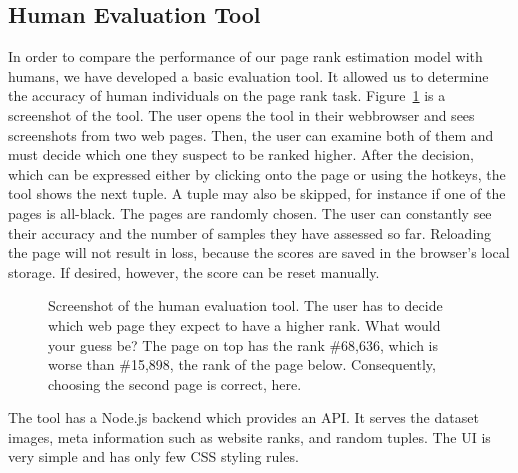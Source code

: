 \subsection{Human Evaluation Tool}
\label{sec:humanevaltool}

In order to compare the performance of our page rank estimation model with humans, we have developed a basic evaluation tool. It allowed us to determine the accuracy of human individuals on the page rank task. Figure~\ref{fig:humanevalscreenshot} is a screenshot of the tool. The user opens the tool in their webbrowser and sees screenshots from two web pages. Then, the user can examine both of them and must decide which one they suspect to be ranked higher. After the decision, which can be expressed either by clicking onto the page or using the hotkeys, the tool shows the next tuple. A tuple may also be skipped, for instance if one of the pages is all-black. The pages are randomly chosen. The user can constantly see their accuracy and the number of samples they have assessed so far. Reloading the page will not result in loss, because the scores are saved in the browser's local storage. If desired, however, the score can be reset manually.

\begin{figure}\centering
    \caption[Screenshot of the human evaluation tool]{Screenshot of the human evaluation tool. The user has to decide which web page they expect to have a higher rank. What would your guess be? The page on top has the rank \#68,636, which is worse than \#15,898, the rank of the page below. Consequently, choosing the second page is correct, here.}\label{fig:humanevalscreenshot}
\end{figure}

The tool has a Node.js backend which provides an API. It serves the dataset images, meta information such as website ranks, and random tuples. The UI is very simple and has only few CSS styling rules.
